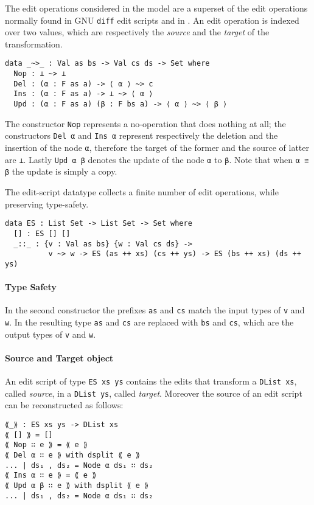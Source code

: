 \documentclass[../Thesis.tex]{subfiles}
\begin{document}
	The edit operations considered in the model are a superset of the edit
	operations normally found in GNU \texttt{diff} edit scripts and in 
	\cite{Lemp09}.
	An edit operation is indexed over two values, which are respectively
	the \emph{source} and the \emph{target} of the transformation.
	
\begin{verbatim}
data _~>_ : Val as bs -> Val cs ds -> Set where
  Nop : ⊥ ~> ⊥
  Del : (α : F as a) -> ⟨ α ⟩ ~> c
  Ins : (α : F as a) -> ⊥ ~> ⟨ α ⟩
  Upd : (α : F as a) (β : F bs a) -> ⟨ α ⟩ ~> ⟨ β ⟩
\end{verbatim}
	
	The constructor \texttt{Nop} represents a no-operation  that does nothing
	at all; the constructors \texttt{Del α} and \texttt{Ins α} represent 
	respectively  the deletion and the insertion of the node \texttt{α}, therefore
	the target of the former and the source of latter are \texttt{⊥}.
	Lastly \texttt{Upd α β} denotes the update of the node \texttt{α}
	to \texttt{β}. Note that when \texttt{α ≅ β} the update is simply a copy.

	The edit-script datatype collects a finite number of edit operations, 
	while preserving type-safety.
\begin{verbatim}
data ES : List Set -> List Set -> Set where
  [] : ES [] []
  _::_ : {v : Val as bs} {w : Val cs ds} -> 
          v ~> w -> ES (as ++ xs) (cs ++ ys) -> ES (bs ++ xs) (ds ++ ys)
\end{verbatim}

	\paragraph{Type Safety}
	In the second constructor the prefixes \texttt{as} and \texttt{cs} match
	the input types of \texttt{v} and \texttt{w}.
	In the resulting type \texttt{as} and \texttt{cs} are replaced with
	\texttt{bs} and \texttt{cs}, which are the output types of 
	\texttt{v} and \texttt{w}.
	
	\paragraph{Source and Target object}
	An edit script of type \texttt{ES xs ys} contains the edits
	that transform a \texttt{DList xs}, called \emph{source}, 
	in a \texttt{DList ys}, called \emph{target}. 
	Moreover the source of an edit script can be reconstructed as follows:
		
\begin{verbatim}
⟪_⟫ : ES xs ys -> DList xs
⟪ [] ⟫ = []
⟪ Nop ∷ e ⟫ = ⟪ e ⟫
⟪ Del α ∷ e ⟫ with dsplit ⟪ e ⟫
... | ds₁ , ds₂ = Node α ds₁ ∷ ds₂
⟪ Ins α ∷ e ⟫ = ⟪ e ⟫
⟪ Upd α β ∷ e ⟫ with dsplit ⟪ e ⟫
... | ds₁ , ds₂ = Node α ds₁ ∷ ds₂
\end{verbatim}
\end{document}
